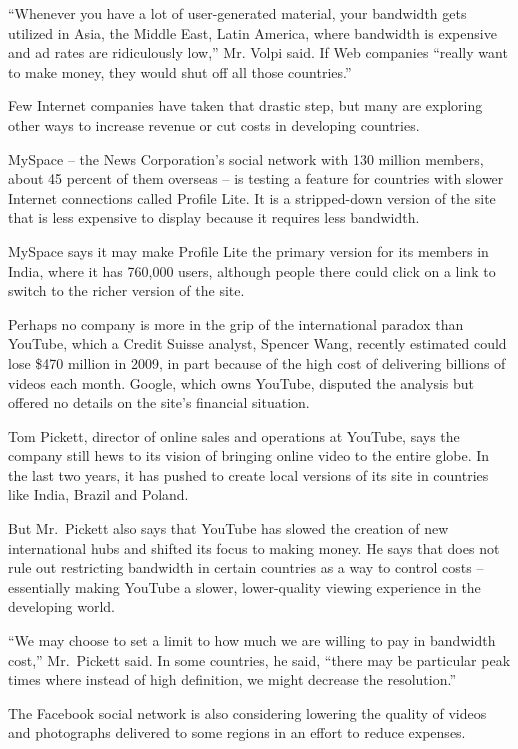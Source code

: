 \documentclass[12pt,a4paper,onecolumn]{article}
\begin{document}
``Whenever you have a lot of user-generated material, your bandwidth gets utilized in Asia, the
Middle East, Latin America, where bandwidth is expensive and ad rates are ridiculously low,'' Mr.
Volpi said. If Web companies ``really want to make money, they would shut off all those countries.''

Few Internet companies have taken that drastic step, but many are exploring other ways to increase
revenue or cut costs in developing countries.

MySpace -- the News Corporation's social network with 130 million members, about 45 percent of them
overseas -- is testing a feature for countries with slower Internet connections called Profile Lite.
It is a stripped-down version of the site that is less expensive to display because it requires less
bandwidth.

MySpace says it may make Profile Lite the primary version for its members in India, where it has
760,000 users, although people there could click on a link to switch to the richer version of the
site.

Perhaps no company is more in the grip of the international paradox than YouTube, which a Credit
Suisse analyst, Spencer Wang, recently estimated could lose \$470 million in 2009, in part because
of the high cost of delivering billions of videos each month. Google, which owns YouTube, disputed
the analysis but offered no details on the site's financial situation.

Tom Pickett, director of online sales and operations at YouTube, says the company still hews to its
vision of bringing online video to the entire globe. In the last two years, it has pushed to create
local versions of its site in countries like India, Brazil and Poland.

But Mr.~Pickett also says that YouTube has slowed the creation of new international hubs and shifted
its focus to making money. He says that does not rule out restricting bandwidth in certain countries
as a way to control costs -- essentially making YouTube a slower, lower-quality viewing experience
in the developing world.

``We may choose to set a limit to how much we are willing to pay in bandwidth cost,'' Mr.~Pickett
said. In some countries, he said, ``there may be particular peak times where instead of high
definition, we might decrease the resolution.''

The Facebook social network is also considering lowering the quality of videos and photographs
delivered to some regions in an effort to reduce expenses.
\end{document}
